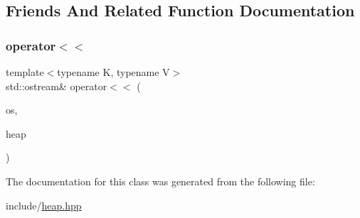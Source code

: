 \subsection{Friends And Related Function Documentation}
\mbox{\label{classngine_1_1MinHeap_a42d373586d09ef865418447803f59a8e}} 
\subsubsection{\texorpdfstring{operator$<$$<$}{operator<<}}
{\footnotesize\ttfamily template$<$typename K, typename V$>$ \\
std\+::ostream\& operator$<$$<$ (\begin{DoxyParamCaption}\item[{std\+::ostream \&}]{os,  }\item[{const \hyperlink{classngine_1_1MinHeap}{Min\+Heap}$<$ K, V $>$ \&}]{heap }\end{DoxyParamCaption})\hspace{0.3cm}{\ttfamily [friend]}}



The documentation for this class was generated from the following file\+:\begin{DoxyCompactItemize}
\item 
include/\hyperlink{heap_8hpp}{heap.\+hpp}\end{DoxyCompactItemize}
